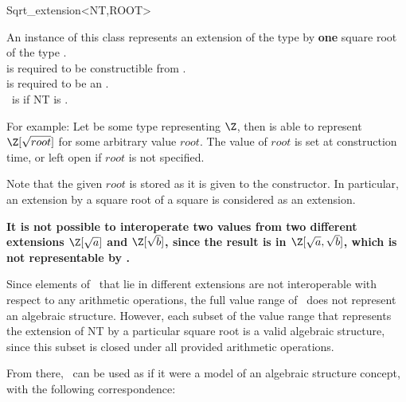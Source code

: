 
\begin{ccRefClass}{Sqrt_extension<NT,ROOT>}

\ccDefinition

An instance of this class represents an extension of the type  by
\textbf{one} square root of the type . \\ 
 is required to be constructible from . \\
 is required to be an . \\
\ccRefName\ is  if NT is  .

For example: Let  be some type representing $\Z$, then 
 is able to represent $\Z[\sqrt{root}]$
for some arbitrary value $root$. The value of $root$ is set at 
construction time, or left open if $root$ is not specified.

Note that the given $root$ is stored as it is given to the constructor. In particular, an extension by a square root of a square is considered as an extension.  


\textbf {It is not possible to interoperate two values from two different 
extensions $\Z[\sqrt{a}]$ and $\Z[\sqrt{b}]$, since the result is in 
$\Z[\sqrt{a},\sqrt{b}]$, which is not representable by 
. }



\begin{ccAdvanced}
 Since elements of \ccRefName\ that lie in different extensions 
are not interoperable with respect to any arithmetic operations, the full
 value range of \ccRefName\ does not represent an algebraic structure.
 However, each subset of the value range that represents the extension of
 NT by a particular square root is a valid algebraic structure, since 
this subset is closed under all provided arithmetic  operations.

From there, \ccRefName\ can be used as if it were a model of an algebraic structure concept, with the following correspondence:


\end{ccAdvanced}
\end{ccRefClass}
